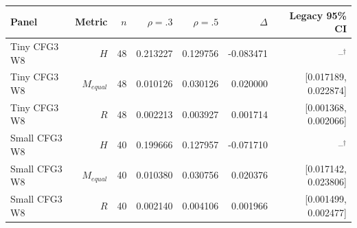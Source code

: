 {\small\setlength{\tabcolsep}{3pt}
\begin{tabular}{lrrrrrr}
\hline
Panel & Metric & $n$ & $\rho=.3$ & $\rho=.5$ & $\Delta$ & Legacy 95\% CI \\
\hline
Tiny CFG3 W8 & $H$ & 48 & 0.213227 & 0.129756 & -0.083471 & --$^\dagger$ \\
Tiny CFG3 W8 & $M_{equal}$ & 48 & 0.010126 & 0.030126 & 0.020000 & [0.017189, 0.022874] \\
Tiny CFG3 W8 & $R$ & 48 & 0.002213 & 0.003927 & 0.001714 & [0.001368, 0.002066] \\
Small CFG3 W8 & $H$ & 40 & 0.199666 & 0.127957 & -0.071710 & --$^\dagger$ \\
Small CFG3 W8 & $M_{equal}$ & 40 & 0.010380 & 0.030756 & 0.020376 & [0.017142, 0.023806] \\
Small CFG3 W8 & $R$ & 40 & 0.002140 & 0.004106 & 0.001966 & [0.001499, 0.002477] \\
\hline
\end{tabular}
}
